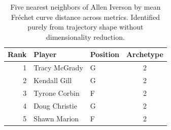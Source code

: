 \begin{table}[htbp]
  \centering\small
  \begin{tabular}{rllc}
    \toprule
    Rank & Player & Position & Archetype \\
    \midrule
    1 & Tracy McGrady & G & 2 \\
    2 & Kendall Gill & G & 2 \\
    3 & Tyrone Corbin & F & 2 \\
    4 & Doug Christie & G & 2 \\
    5 & Shawn Marion & F & 2 \\
    \bottomrule
  \end{tabular}
  \caption{Five nearest neighbors of Allen Iverson by mean Fr\'{e}chet curve distance across metrics. Identified purely from trajectory shape without dimensionality reduction.}
  \label{tab:Allen_Iverson_frechet_curve_neighbors}
\end{table}

